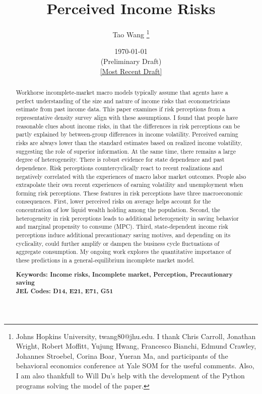 \begin{titlepage}
 \title{Perceived Income Risks}
 
 \author{Tao Wang \thanks{Johns Hopkins University, twang80@jhu.edu. I thank Chris Carroll, Jonathan Wright, Robert Moffitt, Yujung Hwang, Francesco Bianchi, Edmund Crawley, Johannes Stroebel, Corina Boar, Yueran Ma, and participants of the behavioral economics conference at Yale SOM for the useful comments. Also, I am also thankfull to Will Du's help with the development of the Python programs solving the model of the paper.}}

\date{\today \\(Preliminary Draft) \\\href{https://github.com/TaoWangEcon/TaoWangEcon.github.io/blob/master/papers/PerceivedIncomeRisk.pdf}{[Most Recent Draft]}}
	\maketitle
	\begin{abstract}
	\begin{singlespace}
		\noindent Workhorse incomplete-market macro models typically assume that agents have a perfect understanding of the size and nature of income risks that econometricians estimate from past income data. This paper examines if risk perceptions from a representative density survey align with these assumptions. I found that people have reasonable clues about income risks, in that the differences in risk perceptions can be partly explained by between-group differences in income volatility. Perceived earning risks are always lower than the standard estimates based on realized income volatility, suggesting the role of superior information. At the same time, there remains a large degree of heterogeneity. There is robust evidence for state dependence and past dependence. Risk perceptions countercyclically react to recent realizations and negatively correlated with the experiences of macro labor market outcomes. People also extrapolate their own recent experiences of earning volatility and unemployment when forming risk perceptions. These features in risk perceptions have three macroeconomic consequences. First, lower perceived risks on average helps account for the concentration of low liquid wealth holding among the population. Second, the heterogeneity in risk perceptions leads to additional heterogeneity in saving behavior and marginal propensity to consume (MPC). Third, state-dependent income risk perceptions induce additional precautionary saving motives, and depending on its cyclicality, could further amplify or dampen the business cycle fluctuations of aggregate consumption. My ongoing work explores the quantitative importance of these predictions in a general-equilibrium incomplete market model. 
	\end{singlespace}

		\noindent \textbf{Keywords: Income risks, Incomplete market, Perception, Precautionary saving } \\
		\noindent \textbf{JEL Codes: D14, E21, E71, G51} 

	\end{abstract}

\end{titlepage}

